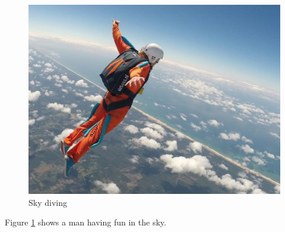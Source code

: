\documentclass{article}
\begin{document}
	\begin{figure}
		\includegraphics[width=\linewidth]{Sky.jpg}
		\caption{Sky diving}
		\label{fig:sky1}
	\end{figure}
	Figure \ref{fig:sky1} shows a man having fun in the sky.
	
\end{document}
